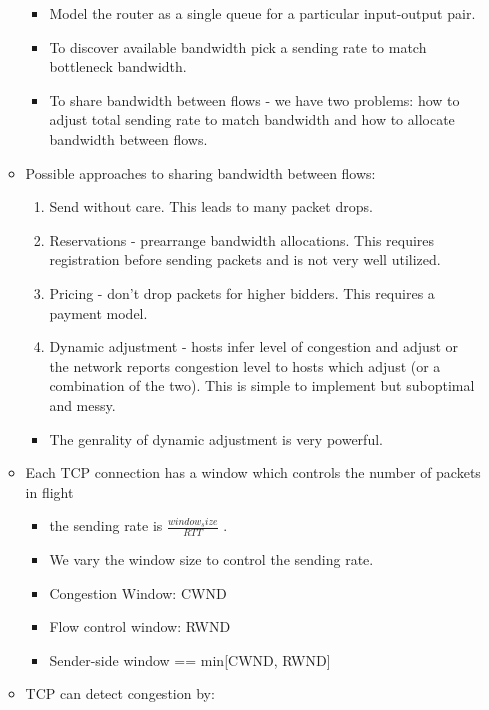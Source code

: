 \begin{itemize}
\begin{itemize}
    \begin{itemize}
    \tightlist
    \item
      Model the router as a single queue for a particular input-output
      pair.
    \item
      To discover available bandwidth pick a sending rate to match
      bottleneck bandwidth.
    \item
      To share bandwidth between flows - we have two problems: how to
      adjust total sending rate to match bandwidth and how to allocate
      bandwidth between flows.
    \end{itemize}
  \item
    Possible approaches to sharing bandwidth between flows:

    \begin{enumerate}
    \def\labelenumi{\arabic{enumi}.}
    \tightlist
    \item
      Send without care. This leads to many packet drops.
    \item
      Reservations - prearrange bandwidth allocations. This requires
      registration before sending packets and is not very well utilized.
    \item
      Pricing - don't drop packets for higher bidders. This requires a
      payment model.
    \item
      Dynamic adjustment - hosts infer level of congestion and adjust or
      the network reports congestion level to hosts which adjust (or a
      combination of the two). This is simple to implement but
      suboptimal and messy.
    \end{enumerate}

    \begin{itemize}
    \tightlist
    \item
      The genrality of dynamic adjustment is very powerful.
    \end{itemize}
  \item
    Each TCP connection has a window which controls the number of
    packets in flight

    \begin{itemize}
    \tightlist
    \item
      the sending rate is \(\frac{window_size}{RTT}\) .
    \item
      We vary the window size to control the sending rate.
    \item
      Congestion Window: CWND
    \item
      Flow control window: RWND
    \item
      Sender-side window == min{[}CWND, RWND{]}
    \end{itemize}
  \item
    TCP can detect congestion by:


\end{itemize}
\end{itemize}
